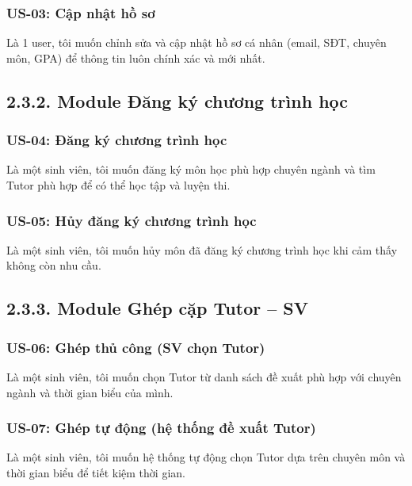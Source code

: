 \subsubsection*{US-03: Cập nhật hồ sơ} 
Là 1 user, tôi muốn chỉnh sửa và cập nhật hồ sơ cá nhân (email, SĐT, chuyên môn, GPA) để thông tin luôn chính xác và mới nhất.


\subsection*{2.3.2. Module Đăng ký chương trình học}
\subsubsection*{US-04: Đăng ký chương trình học} 
Là một sinh viên, tôi muốn đăng ký môn học phù hợp chuyên ngành và tìm Tutor phù hợp để có thể học tập và luyện thi.
\subsubsection*{US-05: Hủy đăng ký chương trình học} 
Là một sinh viên, tôi muốn hủy môn đã đăng ký chương trình học khi cảm thấy không còn nhu cầu.


\subsection*{2.3.3. Module Ghép cặp Tutor – SV}
\subsubsection*{US-06: Ghép thủ công (SV chọn Tutor)} 
Là một sinh viên, tôi muốn chọn Tutor từ danh sách đề xuất phù hợp với chuyên ngành và thời gian biểu của mình.

\subsubsection*{US-07: Ghép tự động (hệ thống đề xuất Tutor)} 
Là một sinh viên, tôi muốn hệ thống tự động chọn Tutor dựa trên chuyên môn và thời gian biểu để tiết kiệm thời gian.

